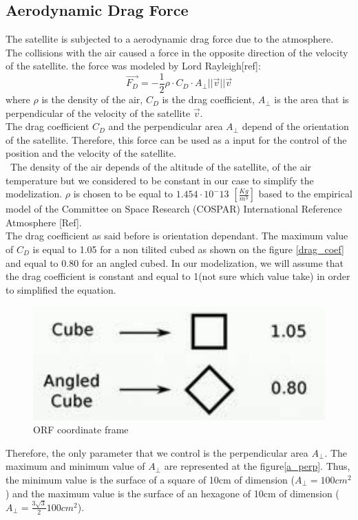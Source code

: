 \subsection{Aerodynamic Drag Force}
The satellite is subjected to a aerodynamic drag force due to the atmosphere. The collisions with the air caused a force in the opposite direction of the velocity of the satellite. the force was modeled by Lord Rayleigh[ref]:
\[
\vec{F_D} = -\frac{1}{2} \rho \cdot C_D \cdot A_{\perp} ||\vec{v}|| \vec{v}
\]
where $\rho$ is the density of the air, $C_D$ is the drag coefficient, $A_{\perp}$ is the area that is perpendicular of the velocity of the satellite $\vec{v}$. \\
The drag coefficient $C_D$ and the perpendicular area $A_{\perp}$ depend of the orientation of the satellite. Therefore, this force can be used as a input for the control of the position and the velocity of the satellite. \\\
The density of the air depends of the altitude of the satellite, of the air temperature but we considered to be constant in our case to simplify the modelization. $\rho$ is chosen to be equal to $1.454 \cdot 10^-13$ $[\frac{Kg}{m^3}]$ based to the  empirical model of the Committee on Space Research (COSPAR) International Reference Atmosphere [Ref]. \\ %
The drag coefficient as said before is orientation dependant. The maximum value of $C_D$ is equal to 1.05 for a non tilited cubed as shown on the figure \ref{drag_coef} and equal to 0.80 for an angled cubed. In our modelization, we will assume that the drag coefficient is constant and equal to 1(not sure which value take) in order to simplified the equation. \\
\begin{figure}[H]
	\centering
	\includegraphics[width=0.4\linewidth]{figures/drag_coef}
	\caption{ORF coordinate frame}
	\label{fig:drag_coef}
\end{figure}
Therefore, the only parameter that we control is the perpendicular area $A_{\perp}$. The maximum and minimum value of $A_{\perp}$ are represented at the figure\ref{a_perp}. Thus, the minimum value is the surface of a square of 10cm of dimension ($A_{\perp} = 100cm^2$) and the maximum value is the surface of an hexagone of 10cm of dimension ($A_{\perp} = \frac{3\sqrt{3}}{2} 100cm^2$).
